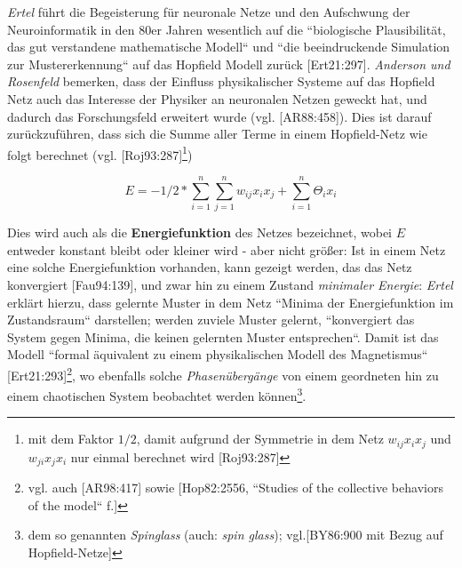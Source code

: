 \textit{Ertel} führt die Begeisterung für neuronale Netze und den Aufschwung der Neuroinformatik in den 80er Jahren wesentlich auf die ``biologische Plausibilität, das gut verstandene mathematische Modell`` und ``die beeindruckende Simulation zur Mustererkennung`` auf das Hopfield Modell zurück [Ert21:297]. \textit{Anderson und Rosenfeld} bemerken, dass der Einfluss physikalischer Systeme auf das Hopfield Netz auch das Interesse der Physiker an neuronalen Netzen geweckt hat, und dadurch das Forschungsfeld erweitert wurde (vgl. [AR88:458]). Dies ist darauf zurückzuführen, dass sich die Summe aller Terme in einem Hopfield-Netz wie folgt berechnet (vgl. [Roj93:287]\footnote{
    mit dem Faktor $1/2$, damit aufgrund der Symmetrie in dem Netz $w_{ij}x_ix_j$ und $w_{ji}x_jx_i$ nur einmal berechnet wird [Roj93:287]
})

\begin{equation}
E = -1/2 * \sum^n_{i=1}\sum^n_{j=1} w_{ij}x_ix_j + \sum^n_{i=1}\Theta_ix_i
\label{eq:gl-energie}
\end{equation}

Dies wird auch als die \textbf{Energiefunktion} des Netzes bezeichnet, wobei $E$ entweder konstant bleibt oder kleiner wird - aber nicht größer: Ist in einem Netz eine solche Energiefunktion vorhanden, kann gezeigt werden, das das Netz konvergiert [Fau94:139], und zwar hin zu einem Zustand \textit{minimaler Energie}: \textit{Ertel} erklärt hierzu, dass gelernte Muster in dem Netz ``Minima der Energiefunktion im Zustandsraum`` darstellen; werden zuviele Muster gelernt, ``konvergiert das System gegen Minima, die keinen gelernten Muster entsprechen``.
Damit ist das Modell ``formal äquivalent zu einem physikalischen Modell des Magnetismus`` [Ert21:293]\footnote{
    vgl. auch [AR98:417] sowie [Hop82:2556, ``Studies of the collective behaviors of the model`` f.]
}, wo ebenfalls solche \textit{Phasenübergänge} von einem geordneten hin zu einem chaotischen System beobachtet werden können\footnote{
    dem so genannten \textit{Spinglass} (auch: \textit{spin glass}); vgl.[BY86:900 mit Bezug auf Hopfield-Netze]
}.\\

